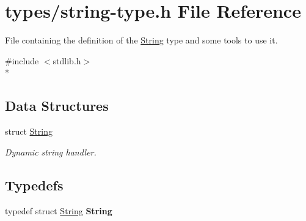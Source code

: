 \hypertarget{string-type_8h}{}\section{types/string-\/type.h File Reference}
\label{string-type_8h}


File containing the definition of the \hyperlink{struct_string}{String} type and some tools to use it.  


{\ttfamily \#include $<$stdlib.\+h$>$}\\*
\subsection*{Data Structures}
\begin{DoxyCompactItemize}
\item 
struct \hyperlink{struct_string}{String}
\begin{DoxyCompactList}\small\item\em Dynamic string handler. \end{DoxyCompactList}\end{DoxyCompactItemize}
\subsection*{Typedefs}
\begin{DoxyCompactItemize}
\item 
typedef struct \hyperlink{struct_string}{String} {\bfseries String}\hypertarget{string-type_8h_afca3b9ff667e55f822ff05e2f13237d1}{}\label{string-type_8h_afca3b9ff667e55f822ff05e2f13237d1}

\end{DoxyCompactItemize}
